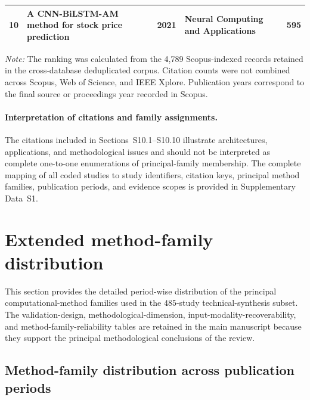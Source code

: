 \documentclass[12pt]{article}
\numberwithin{equation}{section}
\begin{document}
\begin{table}[!t]
\begin{tabular}{@{}rp{6.8cm}rp{4.5cm}r@{}}
10 &
A CNN-BiLSTM-AM method for stock price prediction &
2021 &
Neural Computing and Applications &
595 \\
\bottomrule
\end{tabular}

\vspace{2pt}
\begin{minipage}{0.97\textwidth}
\footnotesize
\textit{Note:} The ranking was calculated from the 4,789
Scopus-indexed records retained in the cross-database deduplicated
corpus. Citation counts were not combined across Scopus,
Web of Science, and IEEE Xplore. Publication years correspond to
the final source or proceedings year recorded in Scopus.
\end{minipage}
\end{table}
\FloatBarrier

\paragraph{Interpretation of citations and family assignments.}
The citations included in Sections~S10.1--S10.10 illustrate
architectures, applications, and methodological issues and should
not be interpreted as complete one-to-one enumerations of
principal-family membership. The complete mapping of all coded
studies to study identifiers, citation keys, principal method
families, publication periods, and evidence scopes is provided in
Supplementary Data~S1.


\section{Extended method-family distribution}
\label{sec:supp-extended-technical}

This section provides the detailed period-wise distribution of the
principal computational-method families used in the
\(485\)-study technical-synthesis subset. The validation-design,
methodological-dimension, input-modality-recoverability, and
method-family-reliability tables are retained in the main manuscript
because they support the principal methodological conclusions of the
review.

\subsection{Method-family distribution across publication periods}
\label{sec:supp-family-period}
\end{document}
